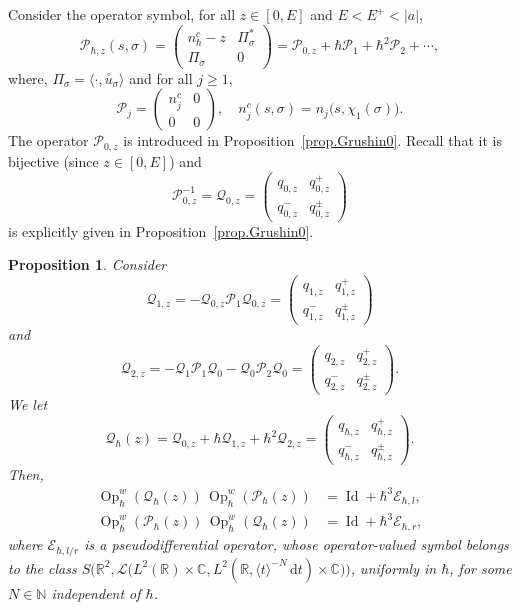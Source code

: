 \documentclass[10pt]{amsart}
\newcommand{\rd}{\,\mathrm{d}}
\DeclareMathOperator{\Id}{Id}
\DeclareMathOperator{\Op}{Op}
\theoremstyle{plain}
\newtheorem{proposition}[theorem]{Proposition}
\theoremstyle{definition}
\newcommand{\R}{\mathbb{R}}
\newcommand{\C}{\mathbb{C}}
\begin{document}
Consider the operator symbol, for all $z\in[0,E]$ and $E<E^+<|a|$,
\begin{equation}\label{eq:Gr1}
\mathscr{P}_{\hbar,z}(s,\sigma)=\begin{pmatrix}
n^c_{\hbar}-z&\Pi^*_\sigma\\
\Pi_\sigma&0
\end{pmatrix}=\mathscr{P}_{0,z}+\hbar\mathscr{P}_1+\hbar^2\mathscr{P}_2+\cdots,\end{equation}
where, $\Pi_{\sigma}=\langle \cdot,\overset{\circ}{u}_\sigma \rangle$ and for all $j\geq 1$,
\begin{equation}\label{eq:Gr2}
\mathscr{P}_j=\begin{pmatrix}
n^c_j&0\\
0&0
\end{pmatrix},\quad n_j^c(s,\sigma)=n_j\bigl(s,\chi_1(\sigma)\bigr).
\end{equation}
The operator $\mathscr P_{0,z}$ is introduced in Proposition~\ref{prop.Grushin0}. Recall that it is bijective (since $z\in[0,E]$) and
\begin{equation}\label{eq:Gr3}
\mathscr P_{0,z}^{-1}=\mathscr Q_{0,z}= \left(\begin{array}{cc}
q_{0,z}&q_{0,z}^+\\
q_{0,z}^-&q_{0,z}^\pm
\end{array}\right)
\end{equation}
is explicitly given in Proposition~\ref{prop.Grushin0}.

\begin{proposition}\label{prop.param}
Consider
\[
\mathscr{Q}_{1,z}=-\mathscr{Q}_{0,z}\mathscr{P}_1\mathscr{Q}_{0,z}= \left(\begin{array}{cc}
q_{1,z}&q_{1,z}^+\\
q_{1,z}^-&q_{1,z}^\pm
\end{array}\right)
\]
and
\[
\mathscr{Q}_{2,z}= -\mathscr Q_1\mathscr P_1\mathscr Q_0-\mathscr Q_0\mathscr P_2\mathscr Q_0=\left(\begin{array}{cc}
q_{2,z}&q_{2,z}^+\\
q_{2,z}^-&q_{2,z}^\pm
\end{array}\right).
\]
We let
\[
\mathscr{Q}_{\hbar}(z)=\mathscr{Q}_{0,z}+\hbar\mathscr{Q}_{1,z}+\hbar^2\mathscr{Q}_{2,z}
=\left(\begin{array}{cc}
q_{\hbar,z}&q^+_{\hbar,z}\\
q^-_{\hbar,z}&q^\pm_{\hbar,z}
\end{array}\right).
\]
Then,
\begin{align*}
\Op^w_\hbar (\mathscr{Q}_\hbar(z))\, \Op^w_\hbar (\mathscr{P}_\hbar(z)) &=\Id+\hbar^3\mathscr E_{\hbar,l},\\
\Op^w_\hbar(\mathscr{P}_\hbar(z))\, \Op^w_\hbar(\mathscr{Q}_\hbar(z)) &=\Id+ \hbar^3\mathscr E_{\hbar,r},\end{align*}
where $\mathscr E_{\hbar,l/r}$ is a pseudodifferential operator, whose operator-valued symbol belongs to the class $S\bigl(\R^2,\mathscr{L}\bigl(L^2(\R)\times\C, L^2(\R,\langle t\rangle^{-N}\rd t)\times\C\bigr)\bigr)$, uniformly in $\hbar$, for some $N\in\mathbb{N}$ independent of $\hbar$.
\end{proposition}
\end{document}
